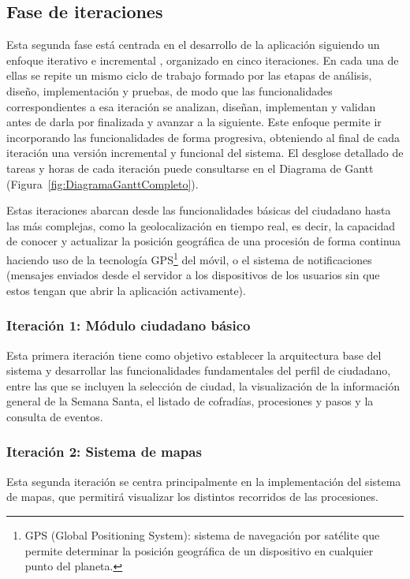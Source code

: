 \subsection{Fase de iteraciones}

Esta segunda fase está centrada en el desarrollo de la aplicación siguiendo un enfoque iterativo e incremental \cite{larman2004}, organizado en cinco iteraciones. En cada una de ellas se repite un mismo ciclo de trabajo formado por las etapas de análisis, diseño, implementación y pruebas, de modo que las funcionalidades correspondientes a esa iteración se analizan, diseñan, implementan y validan antes de darla por finalizada y avanzar a la siguiente. Este enfoque permite ir incorporando las funcionalidades de forma progresiva, obteniendo al final de cada iteración una versión incremental y funcional del sistema. El desglose detallado de tareas y horas de cada iteración puede consultarse en el Diagrama de Gantt (Figura~\ref{fig:DiagramaGanttCompleto}).

Estas iteraciones abarcan desde las funcionalidades básicas del ciudadano hasta las más complejas, como la geolocalización en tiempo real, es decir, la capacidad de conocer y actualizar la posición geográfica de una procesión de forma continua haciendo uso de la tecnología GPS\footnote{GPS (Global Positioning System): sistema de navegación por satélite que permite determinar la posición geográfica de un dispositivo en cualquier punto del planeta.} del móvil, o el sistema de notificaciones (mensajes enviados desde el servidor a los dispositivos de los usuarios sin que estos tengan que abrir la aplicación activamente).

\subsubsection{Iteración 1: Módulo ciudadano básico}

Esta primera iteración tiene como objetivo establecer la arquitectura base del sistema y desarrollar las funcionalidades fundamentales del perfil de ciudadano, entre las que se incluyen la selección de ciudad, la visualización de la información general de la Semana Santa, el listado de cofradías, procesiones y pasos y la consulta de eventos.

\subsubsection{Iteración 2: Sistema de mapas}

Esta segunda iteración se centra principalmente en la implementación del sistema de mapas, que permitirá visualizar los distintos recorridos de las procesiones.

